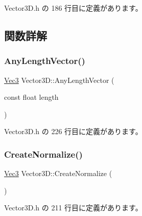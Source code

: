  Vector3\+D.\+h の 186 行目に定義があります。



\subsection{関数詳解}
\mbox{\label{class_vector3_d_a030384bdfe25863cd4be77fa73052cf1}} 
\subsubsection{\texorpdfstring{Any\+Length\+Vector()}{AnyLengthVector()}}
{\footnotesize\ttfamily \mbox{\hyperlink{_vector3_d_8h_ab16f59e4393f29a01ec8b9bbbabbe65d}{Vec3}} Vector3\+D\+::\+Any\+Length\+Vector (\begin{DoxyParamCaption}\item[{const float}]{length }\end{DoxyParamCaption})\hspace{0.3cm}{\ttfamily [inline]}}



 Vector3\+D.\+h の 226 行目に定義があります。

\mbox{\label{class_vector3_d_ae55e42c07bdfcc6c11bcbc6bf5e27808}} 
\subsubsection{\texorpdfstring{Create\+Normalize()}{CreateNormalize()}}
{\footnotesize\ttfamily \mbox{\hyperlink{_vector3_d_8h_ab16f59e4393f29a01ec8b9bbbabbe65d}{Vec3}} Vector3\+D\+::\+Create\+Normalize (\begin{DoxyParamCaption}{ }\end{DoxyParamCaption})\hspace{0.3cm}{\ttfamily [inline]}}



 Vector3\+D.\+h の 211 行目に定義があります。

\mbox{\label{class_vector3_d_accbd42535a385947ac5380084f2c688c}} 
